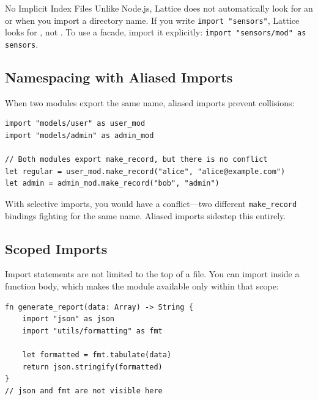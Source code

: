 \begin{notebox}{No Implicit Index Files}
Unlike Node.js, Lattice does not automatically look for an  or  when you import a directory name.
If you write \lstinline|import "sensors"|, Lattice looks for , not .
To use a facade, import it explicitly: \lstinline|import "sensors/mod" as sensors|.
\end{notebox}

\subsection{Namespacing with Aliased Imports}\label{subsec:namespacing}

When two modules export the same name, aliased imports prevent collisions:

\begin{lstlisting}[language=Lattice, caption={Avoiding name collisions}]
import "models/user" as user_mod
import "models/admin" as admin_mod

// Both modules export make_record, but there is no conflict
let regular = user_mod.make_record("alice", "alice@example.com")
let admin = admin_mod.make_record("bob", "admin")
\end{lstlisting}

With selective imports, you would have a conflict---two different \lstinline|make_record| bindings fighting for the same name.
Aliased imports sidestep this entirely.

\subsection{Scoped Imports}\label{subsec:scoped-imports}

Import statements are not limited to the top of a file.
You can import inside a function body, which makes the module available only within that scope:

\begin{lstlisting}[language=Lattice, caption={Scoped import inside a function}]
fn generate_report(data: Array) -> String {
    import "json" as json
    import "utils/formatting" as fmt

    let formatted = fmt.tabulate(data)
    return json.stringify(formatted)
}
// json and fmt are not visible here
\end{lstlisting}

